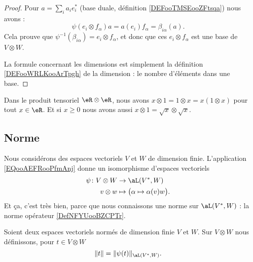 \begin{proof}
    Pour \( a=\sum_ia_ie_i^*\) (base duale, définition \ref{DEFooTMSEooZFtsqa}) nous avons :
    \begin{equation}
        \psi(e_i\otimes f_{\alpha})a=a(e_i)f_{\alpha}=\beta_{i\alpha}(a).
    \end{equation}
    Cela prouve que \( \psi^{-1}(\beta_{i\alpha})=e_i\otimes f_{\alpha}\), et donc que ces \( e_i\otimes f_{\alpha}\) est une base de \( V\otimes W\).

    La formule concernant les dimensions est simplement la définition \ref{DEFooWRLKooArTpgh} de la dimension : le nombre d'éléments dans une base.
\end{proof}

\begin{example}
    Dans le produit tensoriel \( \eR\otimes \eR\), nous avons \( x\otimes 1=1\otimes x=x(1\otimes x)\) pour tout \( x\in \eR\). Et si \( x\geq 0\) nous avons aussi \( x\otimes 1=\sqrt{ x }\otimes \sqrt{ x }\).
\end{example}

\subsection{Norme}

Nous considérons des espaces vectoriels \( V\) et \( W\) de dimension finie. L'application \eqref{EQooAEFRooPfmAnj} donne un isomorphisme d'espaces vectoriels 
\begin{equation} 
    \begin{aligned}
        \psi\colon V\otimes W&\to \aL(V^*,W) \\
        v\otimes w&\mapsto \big( \alpha\mapsto \alpha(v)w \big). 
    \end{aligned}
\end{equation}
Et ça, c'est très bien, parce que nous connaissons une norme sur \( \aL(V^*,W)\) :  la norme opérateur \ref{DefNFYUooBZCPTr}.

\begin{definition}      \label{DEFooEXXNooMgIpSV}
    Soient deux espaces vectoriels normés de dimension finie \( V\) et \( W\). Sur \( V\otimes W\) nous définissons, pour \( t\in V\otimes W\)
    \begin{equation}
        \| t \|=\| \psi(t) \|_{\aL(V^*,W)}.
    \end{equation}
\end{definition}
   
